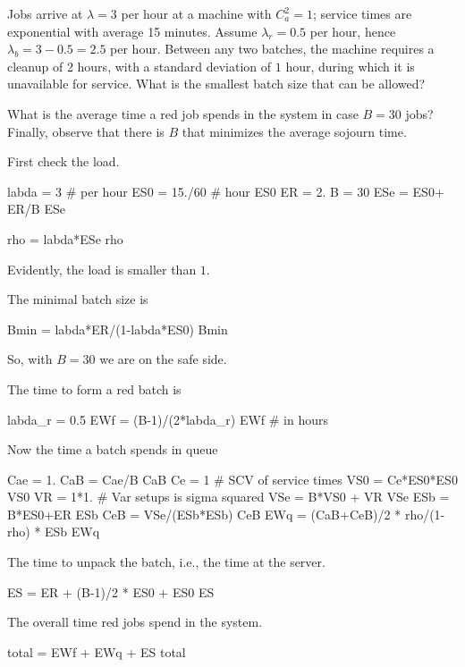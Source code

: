 \begin{exercise}
  Jobs arrive at $\lambda=3$ per hour at a machine with $C_a^2=1$; service times are exponential with average 15 minutes.  Assume $\lambda_r = 0.5$ per hour, hence $\lambda_b = 3-0.5=2.5$ per hour. Between any two batches, the machine requires a cleanup of 2 hours, with a standard deviation of $1$ hour, during which it is unavailable for service.
  What is the smallest batch size that can be allowed?

  What is the average time a red job spends in the system in case $B=30$ jobs?
  Finally, observe that there is $B$ that minimizes the average sojourn time.
  \begin{solution}
First check the load.
\begin{pyconsole}
labda = 3 # per hour
ES0 = 15./60 # hour
ES0
ER = 2.
B = 30
ESe = ES0+ ER/B
ESe

rho = labda*ESe
rho
\end{pyconsole}
Evidently, the load is smaller than $1$. 

The minimal batch size is
\begin{pyconsole}
Bmin = labda*ER/(1-labda*ES0)
Bmin
\end{pyconsole}
So, with $B=30$ we are on the safe side. 

The time to form a red batch is 
\begin{pyconsole}
labda_r = 0.5
EWf = (B-1)/(2*labda_r)
EWf # in hours
\end{pyconsole}

Now the time a batch spends in queue
\begin{pyconsole}
Cae = 1.
CaB = Cae/B
CaB
Ce = 1 # SCV of service times
VS0 = Ce*ES0*ES0
VS0
VR = 1*1. # Var setups is sigma squared
VSe = B*VS0 + VR
VSe
ESb = B*ES0+ER
ESb
CeB = VSe/(ESb*ESb)
CeB
EWq = (CaB+CeB)/2 * rho/(1-rho) * ESb
EWq
\end{pyconsole}

The time to unpack the batch, i.e., the time at the server. 
\begin{pyconsole}
ES = ER + (B-1)/2 * ES0 + ES0  
ES
\end{pyconsole}


The overall time red jobs spend in the system.
\begin{pyconsole}
total = EWf + EWq + ES
total
\end{pyconsole}

  \end{solution}
\end{exercise}

